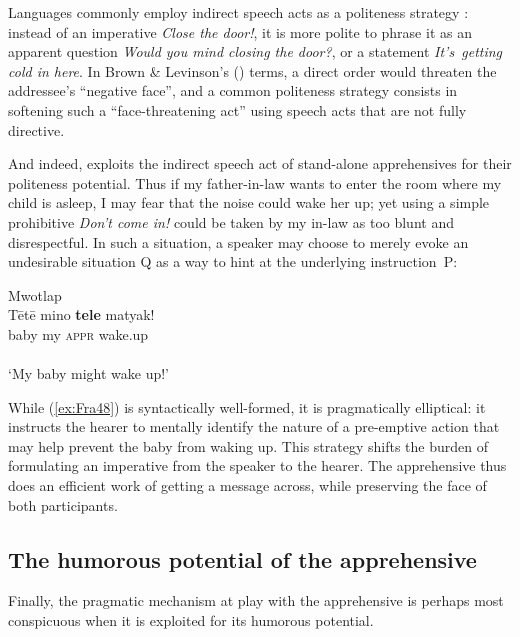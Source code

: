 \documentclass[output=paper,colorlinks,citecolor=brown]{langscibook}
\begin{document}
Languages commonly employ indirect speech acts as a politeness strategy \citep{Searle1975}: instead of an imperative \textit{Close the door!}, it is more polite to phrase it as an apparent question \textit{Would you mind closing the door?}, or a statement \textit{It's~getting cold in here}. In Brown \& Levinson's (\citeyear[70]{BrownLevinson1987}) terms, a direct order would threaten the addressee's ``negative face'', and a common politeness strategy consists in softening such a ``face-threatening act'' using speech acts that are not fully \mbox{directive}.

And indeed,  exploits the indirect speech act of stand-alone apprehensives for their politeness potential. Thus if my father-in-law wants to enter the room where my child is asleep, I may fear that the noise could wake her up; yet using a simple prohibitive \textit{Don't come in!} could be taken by my in-law as too blunt and disrespectful. In such a situation, a  speaker may choose to merely evoke an undesirable situation Q as a way to hint at the underlying instruction~P:


\ea \label{ex:Fra48} \textnormal{Mwotlap} \francoissource{{[Mtp.AF-AP5-41a]}} \\
\gll Tētē mino \textbf{tele} matyak! \\
baby my \textsc{appr} wake.up \\
 \\
`My baby might wake up!' \\
\z


\noindent While (\ref{ex:Fra48}) is syntactically well-formed, it is pragmatically elliptical: it instructs the hearer to mentally identify the nature of a pre-emptive action that may help prevent the baby from waking up. This strategy shifts the burden of formulating an imperative from the speaker to the hearer. The apprehensive thus does an efficient work of getting a message across, while preserving the face of both participants.




\subsection{The humorous potential of the apprehensive}
\label{subsec:humorous}
 
Finally, the pragmatic mechanism at play with the  apprehensive is perhaps most conspicuous when it is exploited for its humorous potential.
\end{document}
